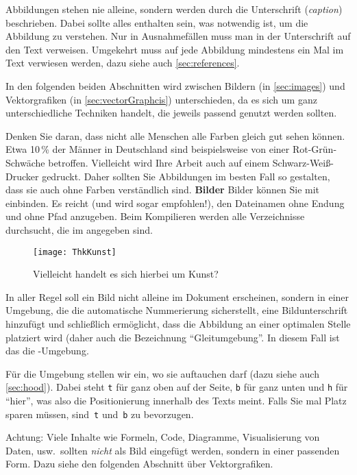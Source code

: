 \par
Abbildungen stehen nie alleine, sondern werden durch die Unterschrift (\emph{caption}) beschrieben. Dabei sollte alles enthalten sein, was notwendig ist, um die Abbildung zu verstehen. Nur in Ausnahmefällen muss man in der Unterschrift auf den Text verweisen. Umgekehrt muss auf jede Abbildung mindestens ein Mal im Text verwiesen werden, dazu siehe auch \cref{sec:references}.
\par
In den folgenden beiden Abschnitten wird zwischen Bildern (in \cref{sec:images}) und Vektorgrafiken (in \cref{sec:vectorGraphcis}) unterschieden, da es sich um ganz unterschiedliche Techniken handelt, die jeweils passend genutzt werden sollten.
\par
Denken Sie daran, dass nicht alle Menschen alle Farben gleich gut sehen können. Etwa 10\,\% der Männer in Deutschland sind beispielsweise von einer Rot-Grün-Schwäche betroffen. Vielleicht wird Ihre Arbeit auch auf einem Schwarz-Weiß-Drucker gedruckt. Daher sollten Sie Abbildungen im besten Fall so gestalten, dass sie auch ohne Farben verständlich sind.
%
%
\textbf{Bilder}
\label{sec:images}
%
Bilder können Sie mit  einbinden. Es reicht (und wird sogar empfohlen!), den Dateinamen ohne Endung und ohne Pfad anzugeben. Beim Kompilieren werden alle Verzeichnisse durchsucht, die im  angegeben sind.
%
\begin{figure}[tbh]
 \centering
 \texttt{[image: ThkKunst]}
 \caption{Vielleicht handelt es sich hierbei um Kunst?}
 \label{fig:kunst}
\end{figure}
%
In aller Regel soll ein Bild nicht alleine im Dokument erscheinen, sondern in einer Umgebung, die die automatische Nummerierung sicherstellt, eine Bildunterschrift hinzufügt und schließlich ermöglicht, dass die Abbildung an einer optimalen Stelle platziert wird (daher auch die Bezeichnung \enquote{Gleitumgebung}. In diesem Fall ist das die -Umgebung.
\par
Für die Umgebung stellen wir ein, wo sie auftauchen darf (dazu siehe auch \cref{sec:hood}). Dabei steht \texttt{t} für ganz oben auf der Seite, \texttt{b} für ganz unten und \texttt{h} für \enquote{hier}, was also die Positionierung innerhalb des Texts meint. Falls Sie mal Platz sparen müssen, sind~\texttt{t} und~\texttt{b} zu bevorzugen.
\par
Achtung: Viele Inhalte wie Formeln, Code, Diagramme, Visualisierung von Daten, usw.\ sollten \emph{nicht} als Bild eingefügt werden, sondern in einer passenden Form. Dazu siehe den folgenden Abschnitt über Vektorgrafiken.
